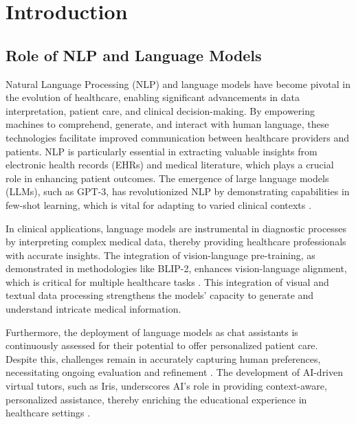 \section{Introduction} \label{sec:Introduction}


\subsection{Role of NLP and Language Models} \label{subsec:Role of NLP and Language Models}



Natural Language Processing (NLP) and language models have become pivotal in the evolution of healthcare, enabling significant advancements in data interpretation, patient care, and clinical decision-making. By empowering machines to comprehend, generate, and interact with human language, these technologies facilitate improved communication between healthcare providers and patients. NLP is particularly essential in extracting valuable insights from electronic health records (EHRs) and medical literature, which plays a crucial role in enhancing patient outcomes. The emergence of large language models (LLMs), such as GPT-3, has revolutionized NLP by demonstrating capabilities in few-shot learning, which is vital for adapting to varied clinical contexts \cite{chowdhery2023palm}.



In clinical applications, language models are instrumental in diagnostic processes by interpreting complex medical data, thereby providing healthcare professionals with accurate insights. The integration of vision-language pre-training, as demonstrated in methodologies like BLIP-2, enhances vision-language alignment, which is critical for multiple healthcare tasks \cite{li2023blip}. This integration of visual and textual data processing strengthens the models' capacity to generate and understand intricate medical information.



Furthermore, the deployment of language models as chat assistants is continuously assessed for their potential to offer personalized patient care. Despite this, challenges remain in accurately capturing human preferences, necessitating ongoing evaluation and refinement \cite{ghosh2024comparedespairreliablepreference}. The development of AI-driven virtual tutors, such as Iris, underscores AI's role in providing context-aware, personalized assistance, thereby enriching the educational experience in healthcare settings \cite{bassner2024irisaidrivenvirtualtutor}.



